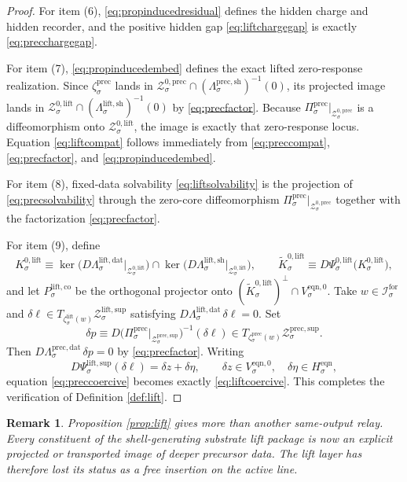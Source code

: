 \documentclass[11pt]{article}
\newcommand{\ForSpace}[1]{\mathcal I_{#1}^{\mathrm{for}}}
\newcommand{\EqnHidden}[1]{H_{#1}^{\mathrm{eqn}}}
\newcommand{\EqnZero}[1]{V_{#1}^{\mathrm{eqn},0}}
\newcommand{\LiftData}[1]{\Lambda_{#1}^{\mathrm{lift,dat}}}
\newcommand{\LiftShellMap}[1]{\Lambda_{#1}^{\mathrm{lift,sh}}}
\newcommand{\LiftSupportShell}[1]{\mathcal Z_{#1}^{\mathrm{lift,sup}}}
\newcommand{\LiftZeroCore}[1]{\mathcal Z_{#1}^{0,\mathrm{lift}}}
\newcommand{\LiftEqChart}[1]{\Psi_{#1}^{\mathrm{lift,sup}}}
\newcommand{\LiftZeroChart}[1]{\Psi_{#1}^{0,\mathrm{lift}}}
\newcommand{\LiftEmbed}[1]{\zeta_{#1}^{\mathrm{lift}}}
\newcommand{\LiftKernel}[1]{K_{#1}^{0,\mathrm{lift}}}
\newcommand{\LiftKernelCh}[1]{\widetilde K_{#1}^{0,\mathrm{lift}}}
\newcommand{\LiftStateComp}[1]{P_{#1}^{\mathrm{lift,co}}}
\newcommand{\PrecProj}[1]{\Pi_{#1}^{\mathrm{prec}}}
\newcommand{\PrecData}[1]{\Lambda_{#1}^{\mathrm{prec,dat}}}
\newcommand{\PrecShellMap}[1]{\Lambda_{#1}^{\mathrm{prec,sh}}}
\newcommand{\PrecSupportShell}[1]{\mathcal Z_{#1}^{\mathrm{prec,sup}}}
\newcommand{\PrecZeroCore}[1]{\mathcal Z_{#1}^{0,\mathrm{prec}}}
\newcommand{\PrecEmbed}[1]{\zeta_{#1}^{\mathrm{prec}}}
\newtheorem{remark}{Remark}
\begin{document}
\begin{proof}
For item (6), \eqref{eq:propinducedresidual} defines the hidden charge and hidden recorder, and the positive hidden gap \eqref{eq:liftchargegap} is exactly \eqref{eq:precchargegap}.

For item (7), \eqref{eq:propinducedembed} defines the exact lifted zero-response realization. Since \(\PrecEmbed{\sigma}\) lands in \(\PrecZeroCore{\sigma}\cap(\PrecShellMap{\sigma})^{-1}(0)\), its projected image lands in \(\LiftZeroCore{\sigma}\cap(\LiftShellMap{\sigma})^{-1}(0)\) by \eqref{eq:precfactor}. Because \(\PrecProj{\sigma}\big|_{\PrecZeroCore{\sigma}}\) is a diffeomorphism onto \(\LiftZeroCore{\sigma}\), the image is exactly that zero-response locus. Equation \eqref{eq:liftcompat} follows immediately from \eqref{eq:preccompat}, \eqref{eq:precfactor}, and \eqref{eq:propinducedembed}.

For item (8), fixed-data solvability \eqref{eq:liftsolvability} is the projection of \eqref{eq:precsolvability} through the zero-core diffeomorphism \(\PrecProj{\sigma}\big|_{\PrecZeroCore{\sigma}}\) together with the factorization \eqref{eq:precfactor}.

For item (9), define
\[
\LiftKernel{\sigma}
\equiv
\ker\bigl(D\LiftData{\sigma}\big|_{\LiftZeroCore{\sigma}}\bigr)
\cap
\ker\bigl(D\LiftShellMap{\sigma}\big|_{\LiftZeroCore{\sigma}}\bigr),
\qquad
\LiftKernelCh{\sigma}
\equiv
D\LiftZeroChart{\sigma}\bigl(\LiftKernel{\sigma}\bigr),
\]
and let \(\LiftStateComp{\sigma}\) be the orthogonal projector onto \((\LiftKernelCh{\sigma})^{\perp}\cap\EqnZero{\sigma}\). Take \(w\in\ForSpace{\sigma}\) and \(\delta \ell\in T_{\LiftEmbed{\sigma}(w)}\LiftSupportShell{\sigma}\) satisfying \(D\LiftData{\sigma}\,\delta \ell=0\). Set
\[
\delta p
\equiv
D\bigl(\PrecProj{\sigma}\big|_{\PrecSupportShell{\sigma}}\bigr)^{-1}(\delta \ell)
\in
T_{\PrecEmbed{\sigma}(w)}\PrecSupportShell{\sigma}.
\]
Then \(D\PrecData{\sigma}\,\delta p=0\) by \eqref{eq:precfactor}. Writing
\[
D\LiftEqChart{\sigma}(\delta \ell)=\delta z+\delta\eta,
\qquad
\delta z\in\EqnZero{\sigma},
\quad
\delta\eta\in\EqnHidden{\sigma},
\]
equation \eqref{eq:preccoercive} becomes exactly \eqref{eq:liftcoercive}. This completes the verification of Definition \ref{def:lift}.
\end{proof}

\begin{remark}
Proposition \ref{prop:lift} gives more than another same-output relay. Every constituent of the shell-generating substrate lift package is now an explicit projected or transported image of deeper precursor data. The lift layer has therefore lost its status as a free insertion on the active line.
\end{remark}
\end{document}
